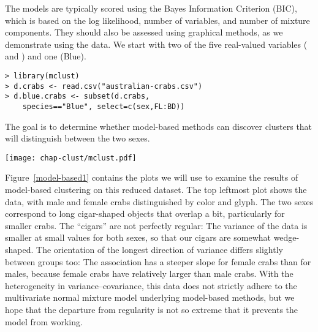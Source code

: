 The models are typically scored using the Bayes Information Criterion
(BIC), which is based on the log likelihood, number of variables, and
number of mixture components.  They should also be assessed using
graphical methods, as we demonstrate using the 
data. 
We start with two of the five real-valued variables ( and ) and one  (Blue).

\begin{verbatim}
> library(mclust)
> d.crabs <- read.csv("australian-crabs.csv")
> d.blue.crabs <- subset(d.crabs,
    species=="Blue", select=c(sex,FL:BD))
\end{verbatim}

\noindent The goal is to determine whether model-based methods can 
discover clusters that will distinguish between the two sexes.

\begin{figure*}[htbp]
\centerline{\texttt{[image: chap-clust/mclust.pdf]}}
\caption[Model-based clustering of a reduced set of ]{Model-based clustering of a reduced set of .  A scatterplot {\bf (top left)} shows the data with values of
 labeled.  A plot of the BIC values for the full range of
models {\bf (top right)} shows that the best model organizes the cases
into two clusters using EEV parametrization.  We label the cases by
cluster for the best model {\bf (middle left)}.  The remaining three
plots include ellipses representing the variance--covariance estimates
of the three best models, EEV-2 {\bf (middle right)}, EEV-3 {\bf
(bottom left)}, and VVV-2 {\bf (bottom right)}.}
\label{model-based1}
\end{figure*}

Figure~\ref{model-based1} contains the plots we will use to examine
the results of model-based clustering on this reduced dataset. The top
leftmost plot shows the data, with male and female crabs distinguished
by color and glyph.  The two sexes correspond to long cigar-shaped
objects that overlap a bit, particularly for smaller crabs.  The
``cigars'' are not perfectly regular: The variance of the data is
smaller at small values for both sexes, so that our cigars are
somewhat wedge-shaped.  The orientation of the longest direction of
variance differs slightly between groups too: The association has a
steeper slope for female crabs than for males, because
female crabs have relatively larger  than male
crabs. With the heterogeneity in variance--covariance, this data does
not strictly adhere to the multivariate normal mixture model
underlying model-based methods, but we hope that the departure from
regularity is not so extreme that it prevents the model from working.

